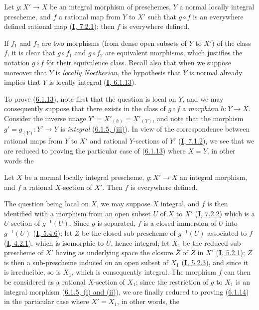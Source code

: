 \begin{proposition}[6.1.13]
\label{II.6.1.13}
Let $g:X'\to X$ be an integral morphism of preschemes, $Y$ a normal locally
integral prescheme, and $f$ a rational map from $Y$ to $X'$ such that
$g\circ f$ is an everywhere defined rational map
\textup{(\hyperref[I.7.2.1]{\textbf{I}, 7.2.1})}; then $f$ is everywhere defined.
\end{proposition}

If $f_1$ and $f_2$ are two morphisms (from dense open subsets of $Y$ to
$X'$) of the class $f$, it is clear that $g\circ f_1$ and $g\circ f_2$ are
equivalent morphisms, which justifies the notation $g\circ f$ for their
equivalence class. Recall also that when we suppose moreover that $Y$ is
\emph{locally Noetherian}, the hypothesis that $Y$ is normal already implies that
$Y$ is locally integral (\hyperref[I.6.1.13]{\textbf{I}, 6.1.13}).

To prove (\hyperref[II.6.1.13]{6.1.13}), note first that the question is
local on $Y$, and we may consequently suppose that there exists in the class
of $g\circ f$ a \emph{morphism} $h:Y\to X$. Consider the inverse image
$Y'=X'_{(h)}=X'_{(Y)}$, and note that the morphism
$g'=g_{(Y)}:Y'\to Y$ is \emph{integral}
(\hyperref[II.6.1.5]{6.1.5, (iii)}). In view of the correspondence between
rational maps from $Y$ to $X'$ and rational $Y$-sections of $Y'$
(\hyperref[I.7.1.2]{\textbf{I}, 7.1.2}), we see that we are reduced to proving the
particular case of (\hyperref[II.6.1.13]{6.1.13}) where $X=Y$, in other
words the

\begin{corollary}[6.1.14]
\label{II.6.1.14}
Let $X$ be a normal locally integral prescheme, $g:X'\to X$ an \textup{integral}
morphism, and $f$ a rational $X$-section of $X'$. Then $f$ is everywhere
defined.
\end{corollary}

The question being local on $X$, we may suppose $X$ integral, and $f$ is then
identified with a morphism from an open subset $U$ of $X$ to $X'$
(\hyperref[I.7.2.2]{\textbf{I}, 7.2.2}) which is a $U$-section of $g^{-1}(U)$.
Since $g$ is separated, $f$ is a closed immersion of $U$ into $g^{-1}(U)$
(\hyperref[I.5.4.6]{\textbf{I}, 5.4.6}); let $Z$ be the closed sub-prescheme of
$g^{-1}(U)$ associated to $f$ (\hyperref[I.4.2.1]{\textbf{I}, 4.2.1}), which is
isomorphic to $U$, hence integral; let $X_1$ be the reduced sub-prescheme of
$X'$ having as underlying space the closure $\overline{Z}$ of $Z$ in $X'$
(\hyperref[I.5.2.1]{\textbf{I}, 5.2.1}); $Z$ is then a sub-prescheme induced on an
open subset of $X_1$ (\hyperref[I.5.2.3]{\textbf{I}, 5.2.3}), and since it is
irreducible, so is $X_1$, which is consequently integral. The morphism $f$
can then be considered as a rational $X$-section of $X_1$; since the
restriction of $g$ to $X_1$ is an integral morphism
(\hyperref[II.6.1.5]{6.1.5, (i) and (ii)}), we are finally reduced to
proving (\hyperref[II.6.1.14]{6.1.14}) in the particular case where
$X'=X_1$, in other words, the

